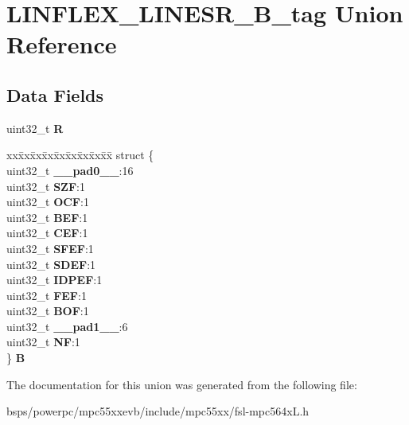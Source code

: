 \hypertarget{unionLINFLEX__LINESR__32B__tag}{}\section{L\+I\+N\+F\+L\+E\+X\+\_\+\+L\+I\+N\+E\+S\+R\+\_\+B\+\_\+tag Union Reference}
\label{unionLINFLEX__LINESR__32B__tag}
\subsection*{Data Fields}
\begin{DoxyCompactItemize}
\item 
\mbox{\label{unionLINFLEX__LINESR__32B__tag_acc62ab3631f0e1fdda2840e3d0cbb4ee}} 
uint32\+\_\+t {\bfseries R}
\item 
\mbox{\label{unionLINFLEX__LINESR__32B__tag_a96c730b3be0ba1cfe2fdd3f820a1167a}} 
\begin{tabbing}
xx\=xx\=xx\=xx\=xx\=xx\=xx\=xx\=xx\=\kill
struct \{\\
\>uint32\_t {\bfseries \_\_pad0\_\_}:16\\
\>uint32\_t {\bfseries SZF}:1\\
\>uint32\_t {\bfseries OCF}:1\\
\>uint32\_t {\bfseries BEF}:1\\
\>uint32\_t {\bfseries CEF}:1\\
\>uint32\_t {\bfseries SFEF}:1\\
\>uint32\_t {\bfseries SDEF}:1\\
\>uint32\_t {\bfseries IDPEF}:1\\
\>uint32\_t {\bfseries FEF}:1\\
\>uint32\_t {\bfseries BOF}:1\\
\>uint32\_t {\bfseries \_\_pad1\_\_}:6\\
\>uint32\_t {\bfseries NF}:1\\
\} {\bfseries B}\\

\end{tabbing}\end{DoxyCompactItemize}


The documentation for this union was generated from the following file\+:\begin{DoxyCompactItemize}
\item 
bsps/powerpc/mpc55xxevb/include/mpc55xx/fsl-\/mpc564x\+L.\+h\end{DoxyCompactItemize}
